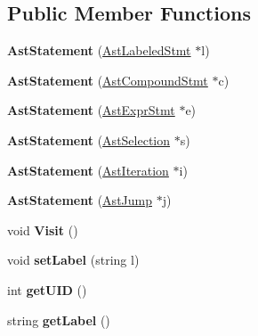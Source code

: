 \subsection*{Public Member Functions}
\begin{DoxyCompactItemize}
\item 
\hypertarget{classAstStatement_a51c4738b3eb4d0ce7f7937580827df49}{{\bfseries Ast\-Statement} (\hyperlink{classAstLabeledStmt}{Ast\-Labeled\-Stmt} $\ast$l)}\label{classAstStatement_a51c4738b3eb4d0ce7f7937580827df49}

\item 
\hypertarget{classAstStatement_a06ab5906e58059421ffca709140ad1b0}{{\bfseries Ast\-Statement} (\hyperlink{classAstCompoundStmt}{Ast\-Compound\-Stmt} $\ast$c)}\label{classAstStatement_a06ab5906e58059421ffca709140ad1b0}

\item 
\hypertarget{classAstStatement_a8a44969c79b381d9cef932fc93d99339}{{\bfseries Ast\-Statement} (\hyperlink{classAstExprStmt}{Ast\-Expr\-Stmt} $\ast$e)}\label{classAstStatement_a8a44969c79b381d9cef932fc93d99339}

\item 
\hypertarget{classAstStatement_a8bc036f0b37cacbfa99159e4c57207ec}{{\bfseries Ast\-Statement} (\hyperlink{classAstSelection}{Ast\-Selection} $\ast$s)}\label{classAstStatement_a8bc036f0b37cacbfa99159e4c57207ec}

\item 
\hypertarget{classAstStatement_ae26acf207adc2d426e558e5889b43b54}{{\bfseries Ast\-Statement} (\hyperlink{classAstIteration}{Ast\-Iteration} $\ast$i)}\label{classAstStatement_ae26acf207adc2d426e558e5889b43b54}

\item 
\hypertarget{classAstStatement_a80c754bbc909f7e2e7938e90485d7065}{{\bfseries Ast\-Statement} (\hyperlink{classAstJump}{Ast\-Jump} $\ast$j)}\label{classAstStatement_a80c754bbc909f7e2e7938e90485d7065}

\item 
\hypertarget{classAstStatement_a1f1570931e373fe2f1e18ce417236ee4}{void {\bfseries Visit} ()}\label{classAstStatement_a1f1570931e373fe2f1e18ce417236ee4}

\item 
\hypertarget{classAST_a71d680856e95ff89f55d5311a552eba6}{void {\bfseries set\-Label} (string l)}\label{classAST_a71d680856e95ff89f55d5311a552eba6}

\item 
\hypertarget{classAST_ab7a5b1d9f1c2de0d98deb356f724a42c}{int {\bfseries get\-U\-I\-D} ()}\label{classAST_ab7a5b1d9f1c2de0d98deb356f724a42c}

\item 
\hypertarget{classAST_aee029be902fffc927d16ccb03eb922ad}{string {\bfseries get\-Label} ()}\label{classAST_aee029be902fffc927d16ccb03eb922ad}

\end{DoxyCompactItemize}
